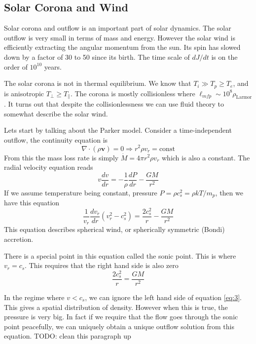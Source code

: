 \documentclass[letterpaper, 11pt]{article}
\numberwithin{equation}{section}
\numberwithin{figure}{section}
\begin{document}
\subsection{Solar Corona and Wind}

Solar corona and outflow is an important part of solar dynamics. The solar
outflow is very small in terms of mass and energy. However the solar wind is
efficiently extracting the angular momentum from the sun. Its spin has slowed
down by a factor of 30 to 50 since its birth. The time scale of $dJ/dt$ is on
the order of $10^{10}$ years.

The solar corona is not in thermal equilibrium. We know that $T_i \gg T_p \geq
T_{e}$, and is anisotropic $T_{\perp}\geq T_{\parallel}$. The corona is mostly
collisionless where $\ell_{mfp}\sim 10^{8}\rho_\mathrm{Larmor}$. It turns out
that despite the collisionlessness we can use fluid theory to somewhat describe
the solar wind.

Lets start by talking about the Parker model. Consider a time-independent
outflow, the continuity equation is
\begin{equation}
  \label{eq:1}
  \nabla\cdot (\rho \mathbf{v}) = 0 \Longrightarrow r^2\rho v_r = \text{const}
\end{equation}
From this the mass loss rate is simply $\dot{M} = 4\pi r^2\rho v_r$ which is
also a constant. The radial velocity equation reads
\begin{equation}
  \label{eq:2}
  v\frac{dv}{dr} = -\frac{1}{\rho}\frac{dP}{dr} - \frac{GM}{r^2}
\end{equation}
If we assume temperature being constant, pressure $P = \rho c_s^2 = \rho
kT/m_p$, then we have this equation
\begin{equation}
  \label{eq:3}
  \frac{1}{v_r}\frac{dv_r}{dr}(v_r^2 - c_s^2) = \frac{2c_s^2}{r} - \frac{GM}{r^2}
\end{equation}
This equation describes spherical wind, or spherically symmetric (Bondi)
accretion.

There is a special point in this equation called the sonic point. This is where
$v_r = c_s$. This requires that the right hand side is also zero
\begin{equation}
  \label{eq:4}
  \frac{2c_s^2}{r} = \frac{GM}{r^2}
\end{equation}

In the regime where $v < c_s$, we can ignore the left hand side of equation
\eqref{eq:3}. This gives a spatial distribution of density. However when this is
true, the pressure is very big. In fact if we require that the flow goes through
the sonic point peacefully, we can uniquely obtain a unique outflow solution
from this equation. TODO: clean this paragraph up
\end{document}
